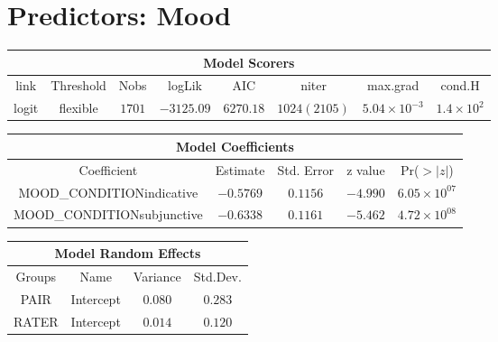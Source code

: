 
\section{Predictors: Mood}
\begin{minipage}{\linewidth}
\begin{tabular}{|c|c|c|c|c|c|c|c|}
\hline
\multicolumn{8}{|c|}{Model Scorers}\\\hline
link  &  Threshold & Nobs & logLik & AIC & niter & max.grad & cond.H\\\hline
logit & flexible & $1701$ & $-3125.09$ & $6270.18$ & $1024(2105)$ & $5.04\times 10^{-3}$ & $1.4\times 10^{2}$\\\hline
\end{tabular}
\end{minipage}
\newline
\newline
\newline
\begin{minipage}{\linewidth}
	\begin{tabular}{|c|c|c|c|c|}
	\hline
	\multicolumn{5}{|c|}{Model Coefficients}\\\hline
	Coefficient & Estimate & Std. Error & z value &Pr($>|z|$)\\\hline
	MOOD_CONDITIONindicative  & $-0.5769$ & $0.1156$ & $-4.990$ & $6.05\times10^{07}$\\\hline
	MOOD_CONDITIONsubjunctive & $-0.6338$ & $0.1161$ & $-5.462$ & $4.72\times10^{08}$\\\hline
	\end{tabular}
\end{minipage}
\newline
\newline
\newline
\begin{minipage}{\linewidth}
\begin{tabular}{|c|c|c|c|}
\hline
\multicolumn{4}{|c|}{Model Random Effects}\\\hline
Groups  &  Name       &  Variance & Std.Dev.\\\hline
PAIR  & Intercept & $0.080$   & $0.283$  \\\hline
RATER & Intercept & $0.014$   & $0.120$ \\\hline
\end{tabular}
\end{minipage}
